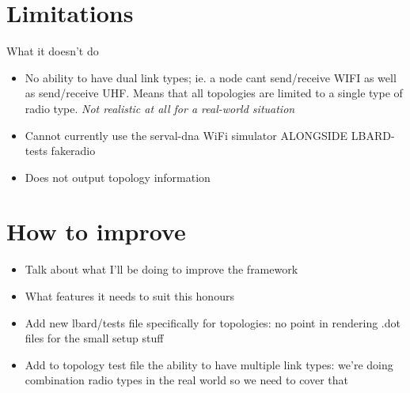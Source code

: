 \section{Limitations}
What it doesn't do
\begin{itemize}
    \item No ability to have dual link types; ie. a node cant send/receive WIFI as well as send/receive UHF. Means that all topologies are limited to a single type of radio type. \emph{Not realistic at all for a real-world situation}
    \item Cannot currently use the serval-dna WiFi simulator ALONGSIDE LBARD-tests fakeradio
    \item Does not output topology information
\end{itemize}

\section{How to improve}
\begin{itemize}
    \item Talk about what I'll be doing to improve the framework
    \item What features it needs to suit this honours
\end{itemize}


\begin{itemize}
    \item Add new lbard/tests file specifically for topologies: no point in rendering .dot files for the small setup stuff
    \item Add to topology test file the ability to have multiple link types: we're doing combination radio types in the real world so we need to cover that
\end{itemize}

